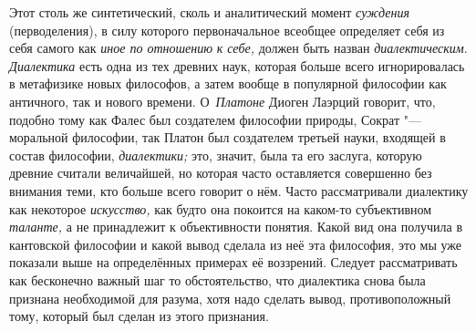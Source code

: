 Этот столь же синтетический, сколь и аналитический момент {\em суждения}
(перводеления), в силу которого первоначальное всеобщее
определяет себя из себя самого как
{\em иное по отношению} {\em к себе,} должен быть
назван {\em диалектическим}. {\em Диалектика} есть одна
из тех древних наук, которая больше всего игнорировалась в метафизике новых
философов, а затем вообще в популярной философии как античного, так и
нового времени. О~{\em Платоне}
Диоген Лаэрций говорит, что, подобно тому как Фалес был
создателем философии природы, Сократ "--- моральной философии,
так Платон был создателем третьей науки, входящей в состав философии,
{\em диалектики;} это,
значит, была та его заслуга, которую древние считали величайшей, но которая
часто оставляется совершенно без внимания теми, кто больше всего говорит о
нём. Часто рассматривали диалектику как некоторое {\em искусство,} как
будто она покоится на каком-то субъективном {\em таланте,} а не
принадлежит к объективности понятия. Какой вид она получила в кантовской
философии и какой вывод сделала из неё эта философия, это мы уже показали
выше на определённых примерах её воззрений. Следует рассматривать как
бесконечно важный шаг то обстоятельство, что диалектика снова была признана
необходимой для разума, хотя надо сделать вывод, противоположный тому,
который был сделан из этого признания.

